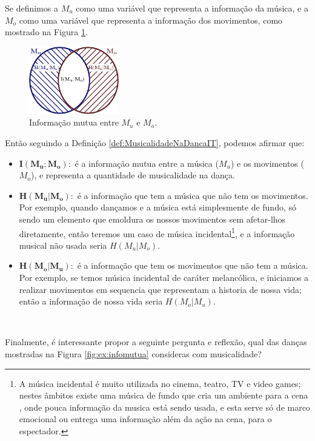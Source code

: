 Se definimos a $M_u$ como uma variável que representa a informação da música, e 
a $M_o$ como uma variável que representa a informação dos movimentos, 
como mostrado na Figura \ref{fig:InfoMutuaMuMo}.
\begin{figure}[!h]
  \centering
    \includegraphics[width=0.35\textwidth]{chapters/cap-musicalidade/musicalidade-it.eps}
\caption{Informação mutua entre $M_u$ e $M_o$.}
\label{fig:InfoMutuaMuMo}
\end{figure}

Então seguindo a Definição \ref{def:MusicalidadeNaDancaIT},
podemos afirmar que:
\begin{itemize}
\item $\mathbf{I(M_u;M_o):}$ é a informação mutua entre a música ($M_u$) e os movimentos ($M_o$),
e representa a quantidade de musicalidade na dança.
\item $\mathbf{H(M_u|M_o):}$ é a informação que tem a música que não tem os movimentos.
Por exemplo, quando dançamos e a música está simplesmente de fundo, 
só sendo um elemento que emoldura os nossos movimentos sem afetar-lhos diretamente,
então teremos um caso de música incidental\footnote{A música incidental é muito utilizada no cinema, 
teatro, TV e video games; nestes âmbitos existe uma música de fundo que cria um ambiente para a cena \cite[pp. 17]{reinato2010musica} \cite[pp. 217]{dourado2004dicionario},
onde pouca informação da musica está sendo usada, e esta serve só de marco emocional ou entrega uma informação além da ação na cena, para o espectador.}, e a informação musical não usada seria $H(M_u|M_o)$.
\item $\mathbf{H(M_o|M_u):}$ é a informação que tem os movimentos que não tem a música.
Por exemplo, se temos música incidental de caráter melancólica, e iniciamos a 
realizar movimentos em sequencia que representam a historia de nossa vida;
então a informação de nossa vida seria  $H(M_o|M_u)$.
\end{itemize}~

Finalmente, é interessante propor a seguinte pergunta e reflexão,
qual das danças mostradas na Figura \ref{fig:ex:infomutua} consideras com musicalidade?


